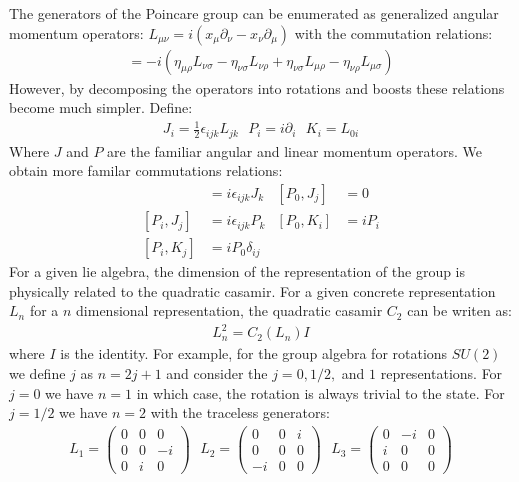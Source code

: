 The generators of the Poincare group can be enumerated as generalized angular momentum operators:
$L_{\mu\nu} = i(x_\mu \partial_\nu - x_\nu \partial_\mu)$ with the commutation relations:
\begin{align*}
[L_{\mu\nu}, L_{\rho\sigma}] = -i(\eta_{\mu\rho} L_{\nu \sigma}  - \eta_{\nu \sigma} L_{\nu \rho} + 
\eta_{\nu \sigma} L_{\mu \rho} - \eta_{\nu \rho} L_{\mu \sigma})
\end{align*}
However, by decomposing the operators into rotations and boosts these relations become much simpler. Define:
\begin{align*}
J_i = \frac{1}{2}\epsilon_{ijk} L_{jk} \text{     } P_i = i\partial_i \text{     } K_i = L_{0i}
\end{align*}
Where $J$ and $P$ are the familiar angular and linear momentum operators. 
We obtain more familar commutations relations:
\begin{align*}
[J_i, J_j] &= i \epsilon_{ijk}J_k  & [P_0,J_j] &= 0 \\
[P_i,J_j] &= i \epsilon_{ijk} P_k & [P_0, K_i] &= i P_i \\
[P_i,K_j] &= i P_0 \delta_{ij} & 
\end{align*}
For a given lie algebra, the dimension of the representation of the group is physically related to the 
 quadratic casamir. For a given concrete representation $L_n$ for a $n$ dimensional
representation, the quadratic casamir $C_2$ can be writen as:
\begin{align*}
L_n^2 = C_2(L_n)I
\end{align*}
where $I$ is the identity. For example, for the group algebra for rotations $SU(2)$ we define $j$ as $n=2j+1$
and consider the $j=0,1/2,$ and $1$ representations. For $j=0$ we have $n=1$ 
 in which case, the rotation is always
trivial to the state. For $j=1/2$ we have $n=2$ with the traceless generators:
\begin{align*}
L_1 = \begin{pmatrix} 0 & 0 & 0 \\ 0 & 0 & -i \\ 0 & i & 0 \end{pmatrix} \text{   } L_2 = \begin{pmatrix} 0 & 0 & i \\ 0 & 0 & 0 \\ -i & 0 & 0 \end{pmatrix} \text{   } L_3 = \begin{pmatrix} 0 & -i & 0 \\ i & 0 & 0 \\ 0 & 0 & 0 \end{pmatrix}
\end{align*}

